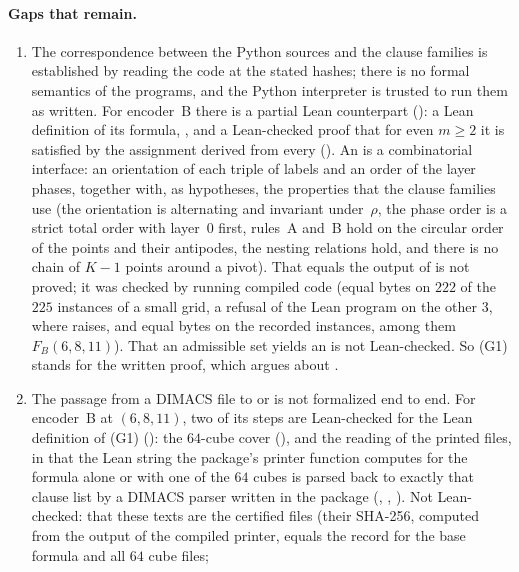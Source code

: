 \paragraph{Gaps that remain.}
\begin{enumerate}[label=(G\arabic*)]
\item The correspondence between the Python sources and the clause families is established by reading the code at the
stated hashes; there is no formal semantics of the programs, and the Python interpreter is trusted to run them as
written. For encoder~B there is a partial Lean counterpart (): a Lean definition of its formula,
, and a Lean-checked proof that for even $m\ge2$ it is satisfied by the assignment derived from every
 (). An  is a combinatorial interface: an orientation of
each triple of labels and an order of the layer phases, together with, as hypotheses, the properties that the clause
families use (the orientation is alternating and invariant under~$\rho$, the phase order is a strict total order with
layer~$0$ first, rules~A and~B hold on the circular order of the points and their antipodes, the nesting relations
hold, and there is no chain of $K-1$ points around a pivot). That  equals the output of
 is not proved; it was checked by running compiled code (equal bytes on $222$ of the $225$ instances
of a small grid, a refusal of the Lean program on the other $3$, where  raises, and equal bytes on the
recorded instances, among them $F_B(6,8,11)$). That an admissible set yields an
 is not Lean-checked. So (G1) stands for the written proof, which argues about .
\item The passage from a DIMACS file to  or  is not formalized end to end. For
encoder~B at $(6,8,11)$, two of its steps are Lean-checked for the Lean definition of (G1) (): the
$64$-cube cover (), and the reading of the printed files, in that the Lean string
the package's printer function computes for the formula alone or with one of the $64$ cubes is parsed back to exactly that clause
list by a DIMACS parser written in the package (, ,
). Not Lean-checked: that these texts are the certified files (their SHA-256,
computed from the output of the compiled printer, equals the record for the base formula and all $64$ cube files;

\end{enumerate}

